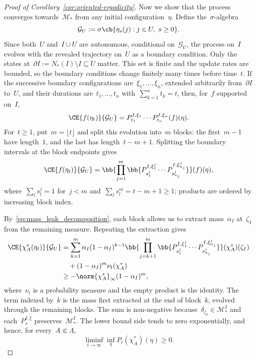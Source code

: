 \begin{proof}[Proof of Corollary~\ref{cor:oriented-ergodicity}]
Now we show that the process converges towards~$\mathcal{M}_*$ from any initial configuration~$\eta$. Define the~$\sigma$-algebra 
\begin{equation*}
\mathcal G_U:=\sigma\cb{\eta_s(j):j\in U,\ s\geq0}.
\end{equation*}
Since both~$U$ and~$I\cup U$ are autonomous,
conditional on~$\mathcal G_U$, the process on~$I$ evolves with
the revealed trajectory on~$U$ as a boundary condition. Only the states at~$\partial I:=N_*(I)\setminus I\subseteq U$ matter.
This set is finite and the update rates are bounded, so the boundary conditions change finitely many times before time~$t$. 
If the successive boundary configurations are~$\xi_1,\ldots,\xi_n$,
extended arbitrarily from~$\partial I$ to~$U$, and their durations
are~$t_1,\ldots,t_n$ with~$\sum_{k=1}^n t_k=t$, then, for~$f$ supported on~$I$,
\begin{equation*}
\CE{f(\eta_t)}{\mathcal G_U}
=P_{t_1}^{I,\xi_1}\cdots P_{t_n}^{I,\xi_n}(f)(\eta).
\end{equation*}
For~$t\geq1$, put~$m=\lfloor t\rfloor$ and split this evolution into~$m$
blocks: the first~$m-1$ have length~$1$, and the last has length~$t-m+1$.
Splitting the boundary intervals at the block endpoints gives
\begin{equation*}
\CE{f(\eta_t)}{\mathcal G_U}
=\bb{\prod_{j=1}^{m}
 \bb{P_{s_1^j}^{I,\xi_1^j}\cdots
     P_{s_{n_j}^j}^{I,\xi_{n_j}^j}}}(f)(\eta),
\end{equation*}
where~$\sum_l s_l^j=1$ for~$j<m$ and~$\sum_l s_l^m=t-m+1\geq1$;
products are ordered by increasing block index.

By~\eqref{eq:mass_leak_decomposition}, each block allows us to extract
mass~$\alpha_I$ at~$\zeta_I$ from the remaining measure.
Repeating the extraction gives
\begin{align*}
\CE{\chi_A^*(\eta_t)}{\mathcal G_U}
&=\sum_{k=1}^{m} \alpha_I(1-\alpha_I)^{k-1}
 \bb{\prod_{j=k+1}^{m}
  \bb{P_{s_1^j}^{I,\xi_1^j}\cdots
      P_{s_{n_j}^j}^{I,\xi_{n_j}^j}}}(\chi_A^*)(\zeta_I)\\
&\quad +(1-\alpha_I)^m\nu_t(\chi_A^*)\\
&\geq-\norm{\chi_A^*}_\infty(1-\alpha_I)^m,
\end{align*}
where~$\nu_t$ is a probability measure and the empty product is the identity.
The term indexed by~$k$ is the mass first extracted at the end of
block~$k$, evolved through the remaining blocks.
The sum is non-negative because~$\delta_{\zeta_I}\in\mathcal M_*^I$
and each~$P_s^{I,\xi}$ preserves~$\mathcal M_*^I$.
The lower bound side tends to zero exponentially,
and hence, for every~$A\Subset\Lambda$,
\begin{equation}\label{eq:convergence_towards_m*}
\liminf_{t\to\infty}\inf_\eta P_t(\chi_A^*)(\eta)\geq0.
\end{equation}


\end{proof}
